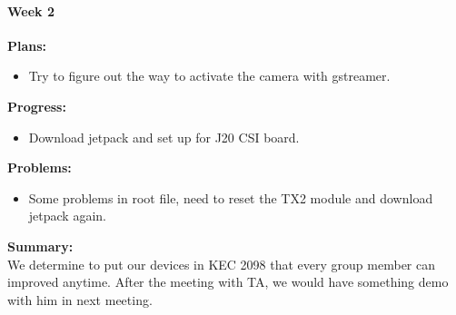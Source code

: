 \paragraph{Week 2}
\begin{adjustwidth}{2.5em}{0pt}
    \vspace{-0.5cm}\textbf{Plans:}
    \vspace{-0.5cm}
    \begin{itemize}
        \item Try to figure out the way to activate the camera with gstreamer. 
    \end{itemize} 
    \vspace{-0.3cm}\textbf{Progress:}
    \vspace{-0.5cm}
    \begin{itemize}
        \item Download jetpack and set up for J20 CSI board.
    \end{itemize} 
    \vspace{-0.3cm}\textbf{Problems:}
    \vspace{-0.5cm}
    \begin{itemize}
        \item Some problems in root file, need to reset the TX2 module and download jetpack again.
    \end{itemize}  
    \vspace{-0.3cm}\noindent\textbf{Summary:}\\
    \noindent We determine to put our devices in KEC 2098 that every group member can improved anytime. 
    After the meeting with TA, we would have something demo with him in next meeting. \\
\end{adjustwidth} 

